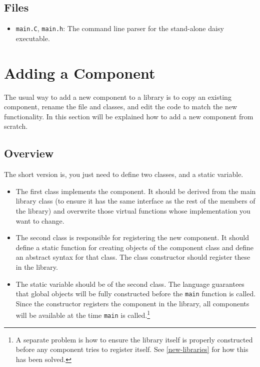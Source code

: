 \documentclass{article}
\newcommand{\cplusplus}%
{{\leavevmode{\rm{\hbox{C\hskip -0.1ex\raise 0.5ex\hbox{\tiny ++}}}}}}
\newcommand{\code}[1]{\texttt{#1}}
\newcommand{\file}[1]{\texttt{#1}}
\begin{document}
\subsection{Files}

\begin{itemize}
\item \file{main.C}, \file{main.h}: The command line parser for
  the stand-alone daisy executable.
\end{itemize}
\pagebreak[0]{}

\section{Adding a Component}
\label{sec:add-component}

The usual way to add a new component to a library is to copy an
existing component, rename the file and classes, and edit the code to
match the new functionality.  In this section will be explained how to
add a new component from scratch. 

\subsection{Overview}

The short version is, you just need to define two classes, and a static
variable.
\begin{itemize}
\item The first class implements the component.  It should be derived
  from the main library class (to ensure it has the same interface as
  the rest of the members of the library) and overwrite those virtual
  functions whose implementation you want to change.
\item The second class is responsible for registering the new
  component.  It should define a static function for creating objects
  of the component class and define an abstract syntax for that class.
  The class constructor should register these in the library.
\item The static variable should be of the second class.  The
  \cplusplus{} language guarantees that global objects will be fully
  constructed before the \code{main} function is called.  Since the
  constructor registers the component in the library, all components
  will be available at the time \code{main} is
  called.\footnote{A separate problem is how to ensure the library
  itself is properly constructed before any component tries to
  register itself.  See \ref{new-libraries} for how this has been
  solved.} 
\end{itemize}
\end{document}

